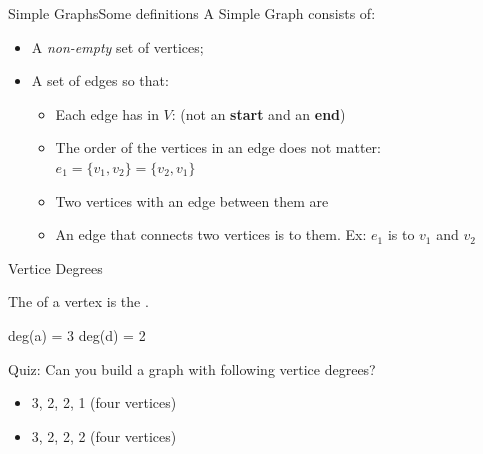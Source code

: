 \begin{frame}{Simple Graphs}{Some definitions}
  A Simple Graph  consists of:
  \begin{itemize}
  \item A \emph{non-empty} set  of vertices;
  \item A set  of edges so that:
    \begin{itemize}
    \item Each edge has  in $V$:
      \hfill (\alert{not an {\bf start} and an {\bf end}})

      \bigskip
    \item The order of the vertices in an edge does not matter:
      \hfill $e_1 = \{v_1,v_2\} = \{v_2, v_1\}$

      \bigskip
    \item Two vertices with an edge between them are

      \bigskip
    \item An edge that connects two vertices is 
      to them.
      \hfill Ex: $e_1$ is  to $v_1$ and $v_2$
    \end{itemize}
  \end{itemize}
\end{frame}

\begin{frame}{Vertice Degrees}

    The  of a vertex is the .

    \begin{center}

      deg(a) = 3 \hspace{1cm} deg(d) = 2
    \end{center}

    \hfill

    \alert{Quiz:} Can you build a graph with following vertice degrees?
    \begin{itemize}
    \item 3, 2, 2, 1 (four vertices)
    \item 3, 2, 2, 2 (four vertices)
    \end{itemize}
\end{frame}

